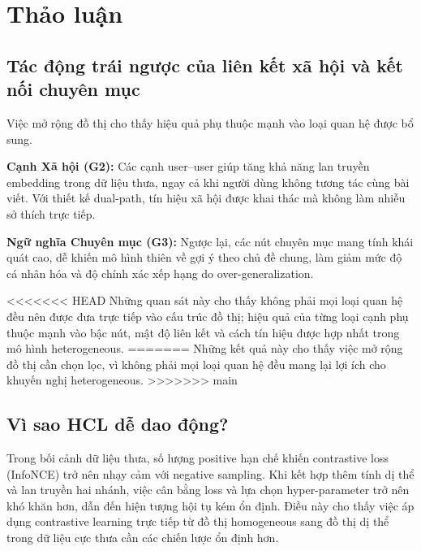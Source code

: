 \documentclass[11pt]{article}
\begin{document}
\FloatBarrier
\section{Thảo luận}
\label{sec:discussion}

\subsection{Tác động trái ngược của liên kết xã hội và kết nối chuyên mục}
Việc mở rộng đồ thị cho thấy hiệu quả phụ thuộc mạnh vào loại quan hệ được bổ sung.

\textbf{Cạnh Xã hội (G2):}
Các cạnh user--user giúp tăng khả năng lan truyền embedding trong dữ liệu thưa,
ngay cả khi người dùng không tương tác cùng bài viết.
Với thiết kế dual-path, tín hiệu xã hội được khai thác mà không làm nhiễu sở thích trực tiếp.

\textbf{Ngữ nghĩa Chuyên mục (G3):}
Ngược lại, các nút chuyên mục mang tính khái quát cao,
dễ khiến mô hình thiên về gợi ý theo chủ đề chung,
làm giảm mức độ cá nhân hóa và độ chính xác xếp hạng do over-generalization.

<<<<<<< HEAD
Những quan sát này cho thấy không phải mọi loại quan hệ đều nên được đưa trực tiếp vào cấu trúc đồ thị; hiệu quả của từng loại cạnh phụ thuộc mạnh vào bậc nút, mật độ liên kết và cách tín hiệu được hợp nhất trong mô hình heterogeneous.
=======
Những kết quả này cho thấy việc mở rộng đồ thị cần chọn lọc,
vì không phải mọi loại quan hệ đều mang lại lợi ích cho khuyến nghị heterogeneous.
>>>>>>> main

\subsection{Vì sao HCL dễ dao động?}
Trong bối cảnh dữ liệu thưa, số lượng positive hạn chế khiến contrastive loss (InfoNCE) trở nên nhạy cảm với negative sampling. Khi kết hợp thêm tính dị thể và lan truyền hai nhánh, việc cân bằng loss và lựa chọn hyper-parameter trở nên khó khăn hơn, dẫn đến hiện tượng hội tụ kém ổn định. Điều này cho thấy việc áp dụng contrastive learning trực tiếp từ đồ thị homogeneous sang đồ thị dị thể trong dữ liệu cực thưa cần các chiến lược ổn định hơn.
\end{document}

